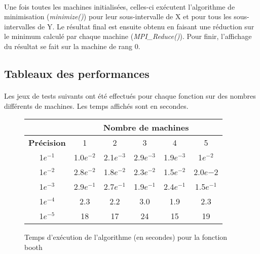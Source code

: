     \paragraph{}
    Une fois toutes les machines initialisées, celles-ci exécutent l'algorithme de minimisation (\textit{minimize()}) pour leur sous-intervalle de X et pour tous les sous-intervalles de Y. Le résultat final est ensuite obtenu en faisant une réduction sur le minimum calculé par chaque machine (\textit{MPI\_Reduce()}). Pour finir, l'affichage du résultat se fait sur la machine de rang 0.    

\subsection{Tableaux des performances}

    \paragraph{}
    Les jeux de tests suivants ont été effectués pour chaque fonction sur des nombres différents de machines. Les temps affichés sont en secondes.
    
    \begin{figure}[!h]
        \begin{center}
            \begin{tabular}{|c|c|c|c|c|c|}
            \hline
                 & \multicolumn{5}{c|}{\textbf{Nombre de machines}} \\ \hline
                \textbf{Précision} & 1 & 2 & 3 & 4 & 5 \\ \hline
                1$e^{-1}$ & 1.0$e^{-2}$ & 2.1$e^{-3}$ & 2.9$e^{-3}$ & 1.9$e^{-3}$ & 1$e^{-2}$ \\ \hline
                1$e^{-2}$ & 2.8$e^{-2}$ & 1.8$e^{-2}$ & 2.3$e^{-2}$ & 1.5$e^{-2}$ & 2.0$e{-2}$ \\ \hline
                1$e^{-3}$ & 2.9$e^{-1}$ & 2.7$e^{-1}$ & 1.9$e^{-1}$ & 2.4$e^{-1}$ & 1.5$e^{-1}$ \\ \hline
                1$e^{-4}$ & 2.3 & 2.2 & 3.0 & 1.9 & 2.3 \\ \hline
                1$e^{-5}$ & 18 & 17 & 24 & 15 & 19 \\ \hline
            \end{tabular}
            \caption{Temps d'exécution de l'algorithme (en secondes) pour la fonction booth}
            \label{tab:mpi-booth}
        \end{center}
    \end{figure}
    

